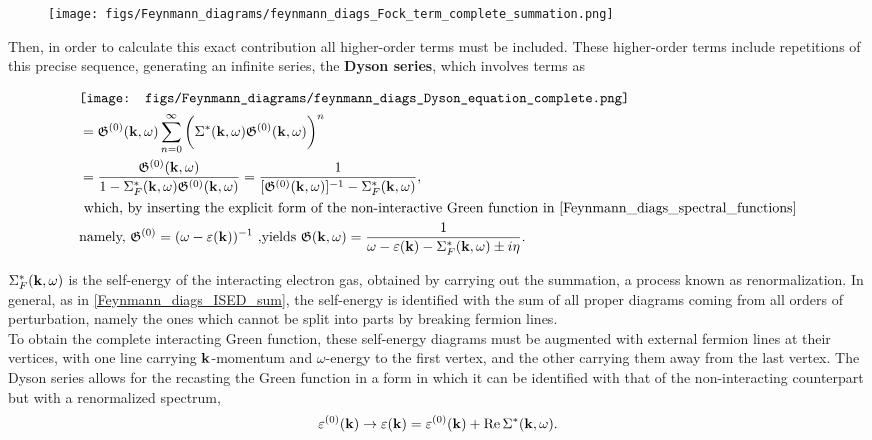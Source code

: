 \documentclass{homework}
\begin{document}
\begin{figure}
\texttt{[image: figs/Feynmann\_diagrams/feynmann\_diags\_Fock\_term\_complete\_summation.png]}
\end{figure} 

Then, in order to calculate this exact contribution all higher-order terms must be included. These higher-order terms include repetitions of this precise sequence, generating an infinite series, the \textbf{Dyson series}, which involves terms as 

\begin{equation}
    \begin{split}
        & \texttt{[image: figs/Feynmann\_diagrams/feynmann\_diags\_Dyson\_equation\_complete.png]} \\
        &= \mathfrak{G}^{(0)}({\bf k}, \omega) \sum_{n=0}^{\infty} \bigg(\Sigma^{*}({\bf k}, \omega)\mathfrak{G}^{(0)}({\bf k}, \omega)\bigg)^n \\
        &= \frac{\mathfrak{G}^{(0)}({\bf k}, \omega)}{1-\Sigma^{*}_F({\bf k}, \omega) \mathfrak{G}^{(0)}({\bf k}, \omega)} = \frac{1}{[\mathfrak{G}^{(0)}({\bf k}, \omega)]^{-1} - \Sigma^{*}_F({\bf k}, \omega)}, \\
        & \textnormal{ which, by inserting the explicit form of the non-interactive Green function in \cref{Feynmann_diags_spectral_functions}} \\
        & \textnormal{namely, $\mathfrak{G}^{(0)} = (\omega - \varepsilon({\bf k}))^{-1}$ ,yields }
        \mathfrak{G}({\bf k}, \omega) = \frac{1}{\omega - \varepsilon({\bf k}) - \Sigma_F^{*}({\bf k}, \omega) \pm i\eta}.
    \end{split}
\end{equation}

$\Sigma_F^{*}({\bf k}, \omega)$ is the self-energy of the interacting electron gas, obtained by carrying out the summation, a process known as renormalization. In general, as in \cref{Feynmann_diags_ISED_sum}, the self-energy is identified with the sum of all proper diagrams coming from all orders of perturbation, namely the ones which cannot be split into parts by breaking fermion lines. \\

To obtain the complete interacting Green function, these self-energy diagrams must be augmented with external fermion lines at their vertices, with one line carrying ${\bf k}$-momentum and $\omega$-energy to the first vertex, and the other carrying them away from the last vertex. The Dyson series allows for the recasting the Green function in a form in which it can be identified with that of the non-interacting counterpart but with a renormalized spectrum, 
$$
    \varepsilon^{(0)}({\bf k}) \rightarrow \varepsilon({\bf k}) = \varepsilon^{(0)}({\bf k}) + \Re \Sigma^{*}({\bf k}, \omega).
$$
\end{document}
